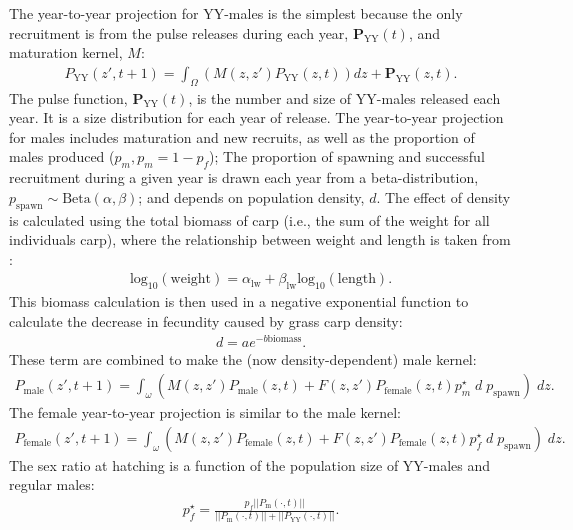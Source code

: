 \documentclass{article}[12pt]
\begin{document}
The year-to-year projection for YY-males is the simplest because the only recruitment is from the pulse releases during each year, \(\textbf{P}_\text{YY}(t)\), and maturation kernel, \(M\):
\begin{eqnarray}
P_\text{YY}(z', t + 1) = \int_\Omega (M (z, z')P_\text{YY}(z, t)) dz + \textbf{P}_\text{YY}(z, t).
\end{eqnarray}
The pulse function, \(\textbf{P}_\text{YY}(t)\), is the number and size of YY-males released each year.
It is a size distribution for each year of release. 
The year-to-year projection for males includes maturation and new recruits, as well as the proportion of males produced (\(p_m, p_m = 1- p_f\)); 
The proportion of spawning and successful recruitment during a given year is drawn each year from a beta-distribution, \(p_\text{spawn} \sim \text{Beta}(\alpha, \beta)\); and 
depends on population density, \(d\).  
The effect of density is calculated using the total biomass of carp (i.e., the sum of the weight for all individuals carp), where
the relationship between weight and length is taken from \cite{wanner2009length}:
\begin{eqnarray}
\text{log}_{10} (\text{weight}) = \alpha_{\text{lw}} + \beta_\text{lw}\text{log}_{10} (\text{length}).
\end{eqnarray}
This biomass calculation is then used in a negative exponential function to calculate the decrease in fecundity caused by grass carp density:
\begin{eqnarray}
d  = a e^{-b \text{biomass}}.
\end{eqnarray}
These term are combined to make the (now density-dependent) male kernel:
\begin{eqnarray}
P_\text{male}(z', t + 1) = \int_\omega (M(z,z') P_\text{male}(z, t) + F(z,z') P_\text{female}(z, t) p_{m}^\star\; d \; p_\text{spawn}) \; dz.
\end{eqnarray}
The female year-to-year projection is similar to the male kernel:
\begin{eqnarray}
P_\text{female}(z', t + 1) = \int_\omega (M(z,z') P_\text{female}(z, t) + F(z,z') P_\text{female}(z, t) p_{f}^\star \; d \; p_\text{spawn}) \; dz.\label{eqn:femaleEQN}
\end{eqnarray}
The sex ratio at hatching is a function of the population size of YY-males and regular males:
\begin{eqnarray}
p_f^\star = \frac{p_f  ||P_\text{m}(\cdot, t)||}{||P_\text{m}(\cdot, t)|| + ||P_\text{YY}(\cdot, t)||}.
\end{eqnarray}
\end{document}
